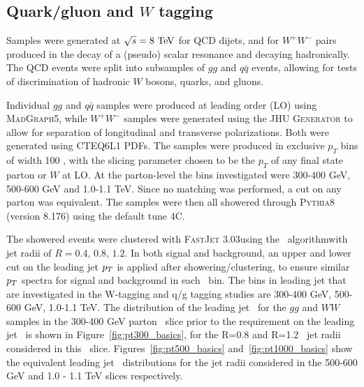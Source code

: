 \subsection{Quark/gluon and $W$ tagging}

Samples were generated at $\sqrt{s} = 8\TeV$ for QCD dijets, and for $W^+W^-$
pairs produced in the decay of a (pseudo) scalar resonance and
decaying hadronically. The QCD events
were split into subsamples of $gg$ and $q\bar{q}$ events, allowing for tests of
discrimination of hadronic $W$ bosons, quarks, and gluons.

Individual $gg$ and $q\bar{q}$ samples were produced at leading order (LO)
using \textsc{MadGraph5}, while $W^+W^-$ samples were generated using
the \textsc{JHU Generator} to allow for separation of longitudinal and
transverse polarizations. Both were generated using \textsc{CTEQ6L1}
PDFs. The samples were produced in exclusive $p_T$ bins
of width 100 {\GeV}, with the slicing parameter
chosen to be the $p_T$ of any final state parton or $W$ at LO. At the
parton-level the \pt bins investigated were 300-400 GeV, 500-600 GeV
and 1.0-1.1 TeV. Since
no matching was performed, a cut on any parton was equivalent. The samples were
then all showered through \textsc{Pythia8} (version 8.176) using the default tune 4C.

The showered events were clustered with \textsc{FastJet}
3.03 using
the \antikt~algorithm with jet radii of $R = 0.4,\, 0.8,\, 1.2$. In
both signal and background, an upper and lower cut on
the leading jet $p_T$ is applied after showering/clustering, to ensure
similar $p_T$ spectra for signal and background in each \pt~bin. The bins
in leading jet \pt that are investigated in the W-tagging and
q/g tagging studies are 300-400 GeV, 500-600 GeV, 1.0-1.1 TeV. The
distribution of the leading jet \pt~for the $gg$ and $WW$ samples in
the 300-400 GeV parton \pt~slice prior to the requirement on the
leading jet \pt~is shown in Figure~\ref{fig:pt300_basics}, for the
R=0.8 and R=1.2 \antikt~jet radii considered in this
\pt~slice. Figures~\ref{fig:pt500_basics} and~\ref{fig:pt1000_basics}
show the equivalent leading jet \pt~distributions for the jet radii
considered in the 500-600 GeV and 1.0 - 1.1 TeV slices respectively.

